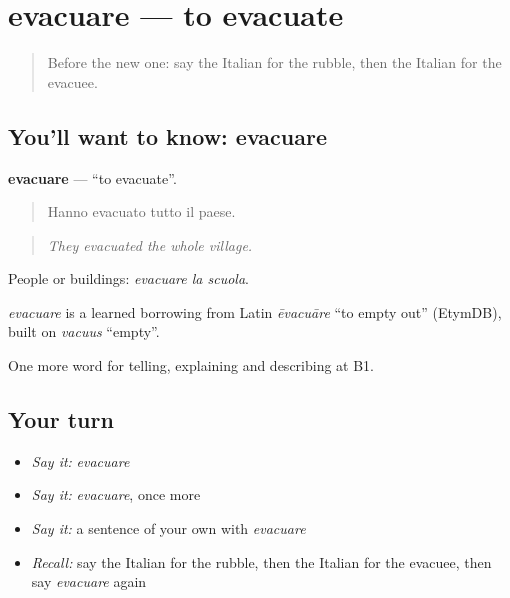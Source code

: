 \section[evacuare]{evacuare — to evacuate}

\label{lesson:IT-C304-evacuare}



\begin{quote}
Before the new one: say the Italian for the rubble, then the Italian for the evacuee.
\end{quote}

\subsection*{You'll want to know: evacuare}
\textbf{evacuare} — \textquotedblleft{}to evacuate\textquotedblright{}.

\begin{quote}
Hanno evacuato tutto il paese.
\end{quote}

\begin{quote}
\emph{They evacuated the whole village.}
\end{quote}

People or buildings: \emph{evacuare la scuola}.

\begin{cousinweb}
\emph{evacuare} is a learned borrowing from Latin \emph{ēvacuāre} \textquotedblleft{}to empty out\textquotedblright{} (EtymDB), built on \emph{vacuus} \textquotedblleft{}empty\textquotedblright{}.
\end{cousinweb}

\begin{grammarlens}[title={What you've built}]
One more word for telling, explaining and describing at B1.
\end{grammarlens}

\subsection*{Your turn}
\begin{itemize}
\raggedright
  \item \emph{Say it:} \emph{evacuare}
  \item \emph{Say it:} \emph{evacuare}, once more
  \item \emph{Say it:} a sentence of your own with \emph{evacuare}
  \item \emph{Recall:} say the Italian for the rubble, then the Italian for the evacuee, then say \emph{evacuare} again
\end{itemize}


